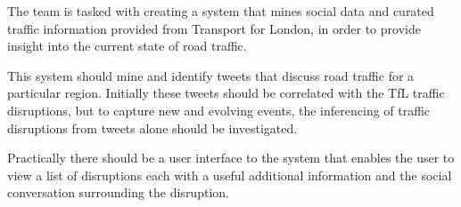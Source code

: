 The team is tasked with creating a system that mines social data and curated
traffic information provided from Transport for London, in order to provide
insight into the current state of road traffic.

This system should mine and identify tweets that discuss road traffic for a
particular region. Initially these tweets should be correlated with the TfL
traffic disruptions, but to capture new and evolving events, the inferencing of
traffic disruptions from tweets alone should be investigated.

Practically there should be a user interface to the system that enables the
user to view a list of disruptions each with a useful additional information
and the social conversation surrounding the disruption.
